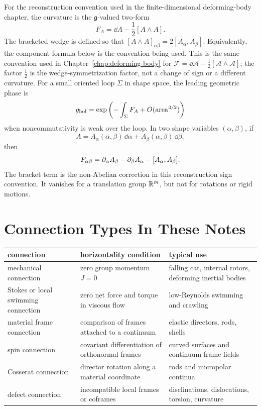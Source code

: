 For the reconstruction convention used in the finite-dimensional
deforming-body chapter, the curvature is the \(\mathfrak{g}\)-valued two-form
\[
        F_A=\dd A-\frac{1}{2}[A\wedge A].
\]
The bracketed wedge is defined so that
\([A\wedge A]_{\alpha\beta}=2[A_\alpha,A_\beta]\). Equivalently, the component
formula below is the convention being used. This is the same convention used in
Chapter~\ref{chap:deforming-body} for
\(\mathcal F=\dd\mathcal A-\frac12[\mathcal A\wedge\mathcal A]\); the factor
\(\frac12\) is the wedge-symmetrization factor, not a change of sign or a
different curvature.
For a small oriented loop \(\Sigma\) in shape space, the leading geometric
phase is
\[
        g_{\rm hol}
        =
        \exp\left(-\int_\Sigma F_A+O(\operatorname{area}^{3/2})\right)
\]
when noncommutativity is weak over the loop.  In two shape variables
\((\alpha,\beta)\), if
\[
        A=A_\alpha(\alpha,\beta)\,\dd\alpha+
          A_\beta(\alpha,\beta)\,\dd\beta,
\]
then
\[
        F_{\alpha\beta}
        =
        \partial_\alpha A_\beta-\partial_\beta A_\alpha-
        [A_\alpha,A_\beta].
\]
The bracket term is the non-Abelian correction in this reconstruction sign
convention.  It vanishes for a translation group \(\mathbb{R}^m\), but not for
rotations or rigid motions.

\section{Connection Types In These Notes}
\label{sec:gauge-connection-types-table}

\begin{center}
\begin{tabular}{p{} p{} p{}}
\hline
connection & horizontality condition & typical use\\
\hline
mechanical connection & zero group momentum \(J=0\) & falling cat, internal
rotors, deforming inertial bodies\\
Stokes or local swimming connection & zero net force and torque in viscous
flow & low-Reynolds swimming and crawling\\
material frame connection & comparison of frames attached to a continuum &
elastic directors, rods, shells\\
spin connection & covariant differentiation of orthonormal frames & curved
surfaces and continuum frame fields\\
Cosserat connection & director rotation along a material coordinate & rods and
micropolar continua\\
defect connection & incompatible local frames or coframes & disclinations,
dislocations, torsion, curvature\\
\hline
\end{tabular}
\end{center}

